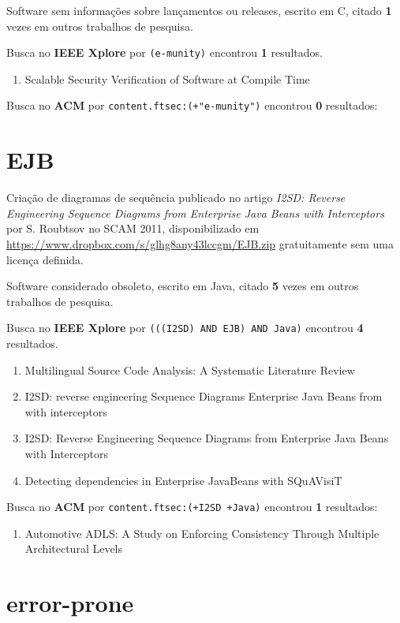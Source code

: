 Software sem informações sobre lançamentos ou releases,
escrito em C,
citado {\bf 1} vezes em outros trabalhos de pesquisa.

Busca no {\bf IEEE Xplore} por
\texttt{(e-munity)}
encontrou {\bf 1}
resultados.

\begin{enumerate}
\item Scalable Security Verification of Software at Compile Time
\end{enumerate}

Busca no {\bf ACM} por
\texttt{content.ftsec:(+"e-munity")}
encontrou {\bf 0}
resultados:


\section{EJB}

Criação de diagramas de sequência
publicado no artigo {\it I2SD: Reverse Engineering Sequence Diagrams from Enterprise Java Beans with Interceptors}
por S. Roubtsov
no SCAM 2011,
disponibilizado em \url{https://www.dropbox.com/s/glhg8any43lccgm/EJB.zip}
gratuitamente
sem uma licença definida.

Software considerado obsoleto,
escrito em Java,
citado {\bf 5} vezes em outros trabalhos de pesquisa.

Busca no {\bf IEEE Xplore} por
\texttt{(((I2SD) AND EJB) AND Java)}
encontrou {\bf 4}
resultados.

\begin{enumerate}
\item Multilingual Source Code Analysis: A Systematic Literature Review
\item I2SD: reverse engineering Sequence Diagrams Enterprise Java Beans from with interceptors
\item I2SD: Reverse Engineering Sequence Diagrams from Enterprise Java Beans with Interceptors
\item Detecting dependencies in Enterprise JavaBeans with SQuAVisiT
\end{enumerate}

Busca no {\bf ACM} por
\texttt{content.ftsec:(+I2SD +Java)}
encontrou {\bf 1}
resultados:

\begin{enumerate}
\item Automotive ADLS: A Study on Enforcing Consistency Through Multiple Architectural Levels
\end{enumerate}

\section{error-prone}

